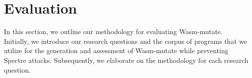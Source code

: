 \documentclass[sigplan,screen]{acmart}
\newcommand*\badge[1]{ \colorbox{red}{\color{white}#1}}
\newcommand{\tool}{Wasm-mutate\xspace}
\newcommand{\Wasm}{WebAssembly\xspace}
\newcommand{\todo}[1]{%
\refstepcounter{todo}
\noindent\textbf{\badge{TODO}} {\color{red}#1}
\addcontentsline{td}{todo}
{\color{red}\thesection.\thetodo\xspace #1}}
\begin{document}
%





\section {Evaluation}
\label{eval}

In this section, we outline our methodology for evaluating \tool.
Initially, we introduce our research questions and the corpus of programs that we utilize for the generation and assessment of \tool while preventing Spectre attacks.
Subsequently, we elaborate on the methodology for each research question.


\newcommand\rqstatic{To what extent are the program variants generated by \tool statically different at the WebAssembly and Machine Code levels?\xspace}

\newcommand\rqdynamic{ To what extent are the program variants generated by \tool dynamically different?\xspace}

\newcommand\rqdefensive{To what extent does \tool prevent Spectre side-channel attacks on \Wasm programs?\xspace}


\newcommand\rqperformance{To what extent does \tool affects \Wasm variants performance?\xspace}

\newcommand\rqofensive{To what extent are the program variants generated by \tool harmful?\xspace}


\newcommand\rqtesting{To what extent can \tool be used to perform differential testing of \Wasm tools?\xspace}

\newcommand{\nProgramsRosetta}{303\xspace}


\newcommand{\DTWStatic}{\ensuremath{\mathit{dt\_static}\xspace}}
\newcommand{\DTWDynamic}{\ensuremath{\mathit{dt\_dy}\xspace}}
\end{document}
